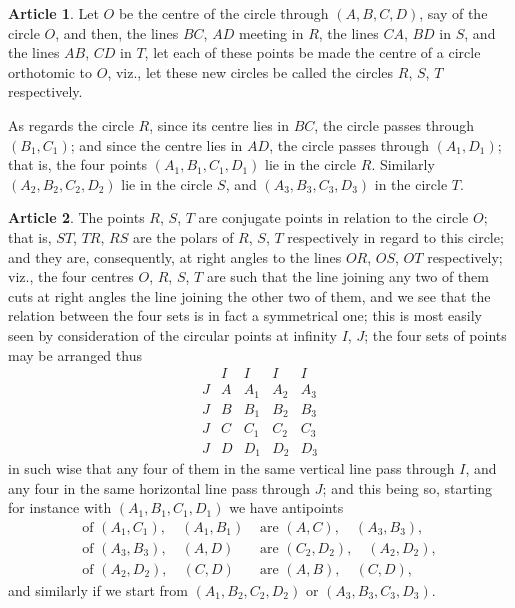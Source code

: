 \documentclass[11pt,a4paper]{article}
\theoremstyle{definition}
\newtheorem{art}{Article}
\begin{document}
\begin{art}
Let $O$ be the centre of the circle through $(A, B, C, D)$, say of the circle $O$, and then, the lines $BC$, $AD$ meeting in $R$, the lines $CA$, $BD$ in $S$, and the lines $AB$, $CD$ in $T$, let each of these points be made the centre of a circle orthotomic to $O$, viz., let these new circles be called the circles $R$, $S$, $T$ respectively.

As regards the circle $R$, since its centre lies in $BC$, the circle passes through $(B_{1}, C_{1})$; and since the centre lies in $AD$, the circle passes through $(A_{1}, D_{1})$; that is, the four points $(A_{1}, B_{1}, C_{1}, D_{1})$ lie in the circle $R$. Similarly $(A_{2}, B_{2}, C_{2}, D_{2})$ lie in the circle $S$, and $(A_{3}, B_{3}, C_{3}, D_{3})$ in the circle $T$.
\end{art}

\begin{art}
The points $R$, $S$, $T$ are conjugate points in relation to the circle $O$; that is, $ST$, $TR$, $RS$ are the polars of $R$, $S$, $T$ respectively in regard to this circle; and they are, consequently, at right angles to the lines $OR$, $OS$, $OT$ respectively; viz., the four centres $O$, $R$, $S$, $T$ are such that the line joining any two of them cuts at right angles the line joining the other two of them, and we see that the relation between the four sets is in fact a symmetrical one; this is most easily seen by consideration of the circular points at infinity $I$, $J$; the four sets of points may be arranged thus
\[
\begin{array}{c|cccc}
& I & I & I & I \\ \hline
J & A & A_{1} & A_{2} & A_{3} \\
J & B & B_{1} & B_{2} & B_{3} \\
J & C & C_{1} & C_{2} & C_{3} \\
J & D & D_{1} & D_{2} & D_{3}
\end{array}
\]
in such wise that any four of them in the same vertical line pass through $I$, and any four in the same horizontal line pass through $J$; and this being so, starting for instance with $(A_{1}, B_{1}, C_{1}, D_{1})$ we have antipoints
\begin{align*}
\text{of } (A_{1}, C_{1}), \quad (A_{1}, B_{1}) &\text{ are } (A, C), \quad (A_{3}, B_{3}), \\
\text{of } (A_{3}, B_{3}), \quad (A, D) &\text{ are } (C_{2}, D_{2}), \quad (A_{2}, D_{2}), \\
\text{of } (A_{2}, D_{2}), \quad (C, D) &\text{ are } (A, B), \quad (C, D),
\end{align*}
and similarly if we start from $(A_{1}, B_{2}, C_{2}, D_{2})$ or $(A_{3}, B_{3}, C_{3}, D_{3})$.
\end{art}
\end{document}
